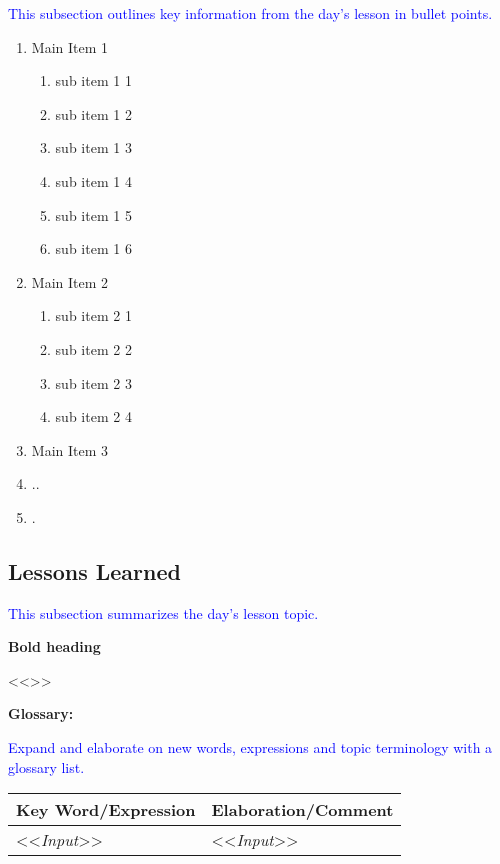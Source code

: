 {{\textcolor{blue}{This subsection outlines key information from the day's lesson in bullet points.}}

\begin{enumerate}
    \item Main Item 1
    \begin{enumerate}
        \item sub item 1 1
        \item sub item 1 2
        \item sub item 1 3
        \item sub item 1 4
        \item sub item 1 5
        \item sub item 1 6
    \end{enumerate}
    \item Main Item 2
    \begin{enumerate}
        \item sub item 2 1
        \item sub item 2 2
        \item sub item 2 3
        \item sub item 2 4
    \end{enumerate}
    \item Main Item 3
    \item ..
    \item .
\end{enumerate}


\subsection{Lessons Learned}

{\textcolor{blue}{This subsection summarizes the day's lesson topic.}}

{\bfseries{Bold heading}}

<<{\emph{\blindtext[2]}}>>


{\bfseries{Glossary:}}

{\textcolor{blue}{Expand and elaborate on new words, expressions and topic terminology with a glossary list.}}

\begin{tabular}{p{40mm} | p{120mm}}
    {\bfseries{Key Word/Expression}} & {\bfseries{Elaboration/Comment}}\\ \hline
    <<{\emph{Input}}>> & <<{\emph{Input}}>>\\ \hline
\end{tabular}




}
